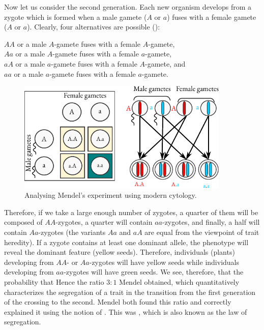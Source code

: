Now let us consider the second generation. Each new organism
develops from a zygote which is formed when a male gamete ($A$ or $a$)
fuses with a female gamete ($A$ or $a$). Clearly, four alternatives are
possible ():
\begin{mybox}{}
 $AA$ or a male $A$-gamete fuses with a female $A$-gamete,\\
$Aa$ or a male $A$-gamete fuses with a female $a$-gamete,\\
$aA$ or a male $a$-gamete fuses with a female $A$-gamete, and\\
$aa$ or a male $a$-gamete fuses with a female $a$-gamete.
\end{mybox}


\begin{figure}[!ht]
\centering
\includegraphics[width=0.9\textwidth]{figures/genes1.pdf}
\caption{Analysing Mendel's experiment using modern cytology.\label{genes1}}
\end{figure}

 Therefore, if we take a large enough number of zygotes, a quarter of them will be composed of
$AA$-zygotes, a quarter will contain $aa$-zygotes, and finally, a half will
contain $Aa$-zygotes (the variants $Aa$ and $aA$ are equal from the
viewpoint of trait heredity). If a zygote contains at least one dominant
allele, the phenotype will reveal the dominant feature (yellow seeds).
Therefore, individuals (plants) developing from $AA$- or $Aa$-zygotes will
have yellow seeds while individuals developing from $aa$-zygotes will have
green seeds. We see, therefore, that the probability that  Hence the ratio $3:1$ Mendel obtained,
which quantitatively characterizes the segregation of a trait in the
transition from the first generation of the crossing to the second. Mendel
both found this ratio and correctly explained it using the notion of
. This was , which is also known as the law of segregation.

